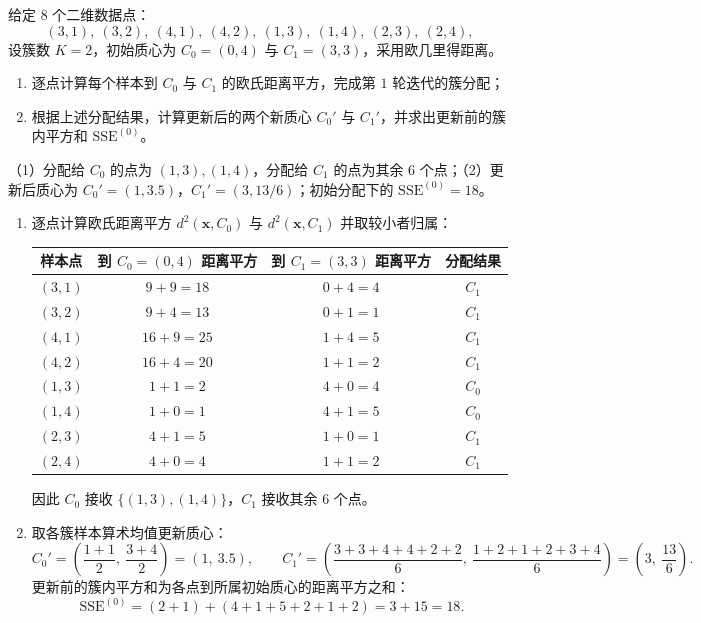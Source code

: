\begin{exercise}[title={K-Means 单轮迭代与初始 SSE 完整手算},level=standard,points=15,tags={K-Means,SSE,手算}]
给定 $8$ 个二维数据点：
\[
  (3,1),\ (3,2),\ (4,1),\ (4,2),\ (1,3),\ (1,4),\ (2,3),\ (2,4),
\]
设簇数 $K=2$，初始质心为 $C_0 = (0, 4)$ 与 $C_1 = (3, 3)$，采用欧几里得距离。
\begin{enumerate}
  \item 逐点计算每个样本到 $C_0$ 与 $C_1$ 的欧氏距离平方，完成第 $1$ 轮迭代的簇分配；
  \item 根据上述分配结果，计算更新后的两个新质心 $C_0'$ 与 $C_1'$，并求出更新前的簇内平方和 $\mathrm{SSE}^{(0)}$。
\end{enumerate}
\begin{answer}
（1）分配给 $C_0$ 的点为 $(1,3),(1,4)$，分配给 $C_1$ 的点为其余 $6$ 个点；（2）更新后质心为 $C_0'=(1, 3.5)$，$C_1'=(3, 13/6)$；初始分配下的 $\mathrm{SSE}^{(0)} = 18$。
\end{answer}
\begin{solution}
\begin{enumerate}
  \item 逐点计算欧氏距离平方 $d^2(\bm{x}, C_0)$ 与 $d^2(\bm{x}, C_1)$ 并取较小者归属：
  \begin{center}
    \small
    \begin{tabular}{@{}cccc@{}}
      \toprule
      样本点 & 到 $C_0=(0,4)$ 距离平方 & 到 $C_1=(3,3)$ 距离平方 & 分配结果 \\
      \midrule
      $(3,1)$ & $9 + 9 = 18$ & $0 + 4 = 4$ & $C_1$ \\
      $(3,2)$ & $9 + 4 = 13$ & $0 + 1 = 1$ & $C_1$ \\
      $(4,1)$ & $16 + 9 = 25$ & $1 + 4 = 5$ & $C_1$ \\
      $(4,2)$ & $16 + 4 = 20$ & $1 + 1 = 2$ & $C_1$ \\
      $(1,3)$ & $1 + 1 = 2$ & $4 + 0 = 4$ & $C_0$ \\
      $(1,4)$ & $1 + 0 = 1$ & $4 + 1 = 5$ & $C_0$ \\
      $(2,3)$ & $4 + 1 = 5$ & $1 + 0 = 1$ & $C_1$ \\
      $(2,4)$ & $4 + 0 = 4$ & $1 + 1 = 2$ & $C_1$ \\
      \bottomrule
    \end{tabular}
  \end{center}
  因此 $C_0$ 接收 $\{(1,3),(1,4)\}$，$C_1$ 接收其余 $6$ 个点。
  \item 取各簇样本算术均值更新质心：
  \[
    C_0' = \left(\frac{1+1}{2},\ \frac{3+4}{2}\right) = (1,\ 3.5),\qquad
    C_1' = \left(\frac{3+3+4+4+2+2}{6},\ \frac{1+2+1+2+3+4}{6}\right) = \left(3,\ \frac{13}{6}\right).
  \]
  更新前的簇内平方和为各点到所属初始质心的距离平方之和：
  \[
    \mathrm{SSE}^{(0)} = (2 + 1) + (4 + 1 + 5 + 2 + 1 + 2) = 3 + 15 = 18.
  \]
\end{enumerate}
\end{solution}
\end{exercise}

